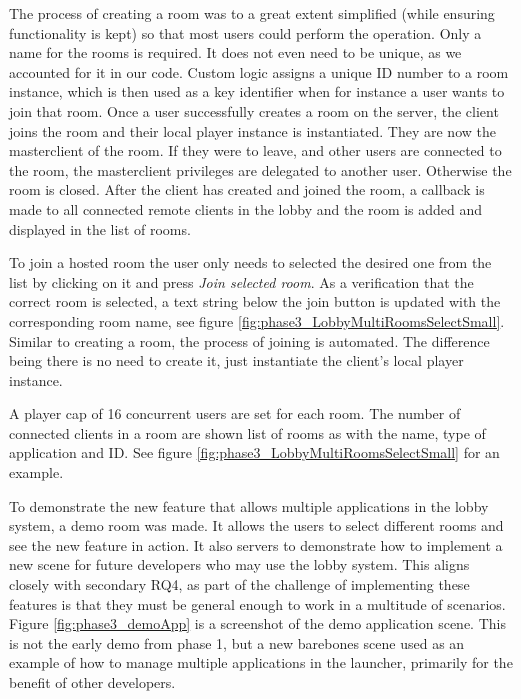 The process of creating a room was to a great extent simplified (while ensuring functionality is kept) so that most users could perform the operation. Only a name for the rooms is required. It does not even need to be unique, as we accounted for it in our code. Custom logic assigns a unique ID number to a room instance, which is then used as a key identifier when for instance a user wants to join that room. Once a user successfully creates a room on the server, the client joins the room and their local player instance is instantiated. They are now the masterclient of the room. If they were to leave, and other users are connected to the room, the masterclient privileges are delegated to another user. Otherwise the room is closed. After the client has created and joined the room, a callback is made to all connected remote clients in the lobby and the room is added and displayed in the list of rooms. 

To join a hosted room the user only needs to selected the desired one from the list by clicking on it and press \textit{Join selected room}. As a verification that the correct room is selected, a text string below the join button is updated with the corresponding room name, see figure \ref{fig:phase3_LobbyMultiRoomsSelectSmall}. Similar to creating a room, the process of joining is automated. The difference being there is no need to create it, just instantiate the client's local player instance. 

A player cap of 16 concurrent users are set for each room. The number of connected clients in a room are shown list of rooms as with the name, type of application and ID. See figure \ref{fig:phase3_LobbyMultiRoomsSelectSmall} for an example.  


To demonstrate the new feature that allows multiple applications in the lobby system, a demo room was made. It allows the users to select different rooms and see the new feature in action. It also servers to demonstrate how to implement a new scene for future developers who may use the lobby system. This aligns closely with secondary RQ4, as part of the challenge of implementing these features is that they must be general enough to work in a multitude of scenarios. Figure \ref{fig:phase3_demoApp} is a screenshot of the demo application scene. This is not the early demo from phase 1, but a new barebones scene used as an example of how to manage multiple applications in the launcher, primarily for the benefit of other developers.  


